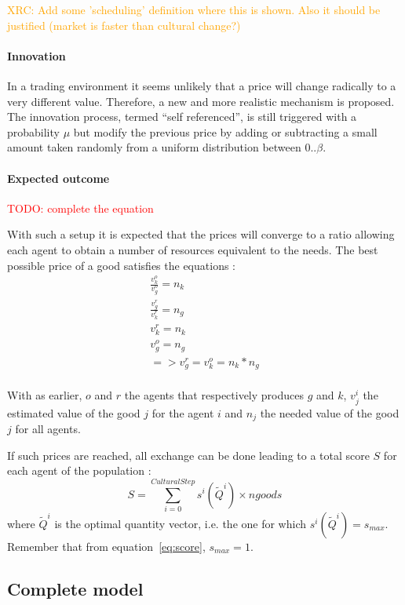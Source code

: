 \documentclass{wscpaperproc}
\newcommand{\memo}[2]{\textcolor{#1}{#2}}
\newcommand{\todo}[1]{\memo{red}{TODO: #1\\}}
\newcommand{\xrc}[1]{\memo{orange}{XRC: #1\\}}
\begin{document}
\xrc{Add some 'scheduling' definition where this is shown. Also it should be justified (market is faster than cultural change?)}

\paragraph{Innovation} In a trading environment it seems unlikely that a price will change radically to a very different value. Therefore, a new and more realistic mechanism is proposed. The innovation process, termed ``self referenced'', is still triggered with a probability $\mu$ 
but modify the previous price by adding or subtracting a small amount taken randomly from a uniform  distribution between $0 .. \beta$.


\paragraph{Expected outcome} 

\todo{complete the equation}

With such a setup it is expected that the prices will converge to a ratio allowing each agent to obtain a number of resources equivalent to the needs. The best possible price of a good satisfies the equations :
\begin{align}
\frac{v^o_k}{v^o_g} = n_k \\
\frac{v^r_g}{v^r_k} = n_g \\
v^r_k = n_k \\
v^o_g = n_g \\
=>v^r_g = v^o_k = n_k * n_g \\
\end{align}

With as earlier, $o$ and $r$ the agents that respectively produces $g$ and $k$, $v_j^i$ the estimated value of the good $j$ for the agent $i$ and $n_j$ the needed value of the good $j$ for all agents.

If such prices are reached, all exchange can be done leading to a total score $S$ for each agent of the population : 
$$ S = \sum_{i=0}^{CulturalStep}  s^i(\tilde{Q}^i) \times ngoods $$ 
where $\tilde{Q}^i$ is the optimal quantity vector, i.e. the one for which $s^i(\tilde{Q}^i) = s_{max}$. Remember that from equation~\ref{eq:score}, $s_{max}=1$.


\subsection{Complete model}
\end{document}
